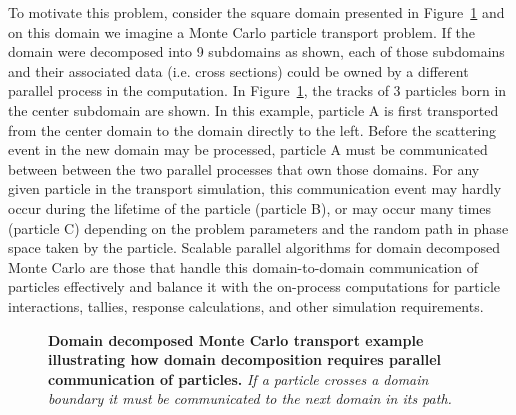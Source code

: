 To motivate this problem, consider the square domain presented in
Figure~\ref{fig:ddmc_example} and on this domain we imagine a Monte
Carlo particle transport problem. If the domain were decomposed into 9
subdomains as shown, each of those subdomains and their associated
data (i.e. cross sections) could be owned by a different parallel
process in the computation. In Figure~\ref{fig:ddmc_example}, the
tracks of 3 particles born in the center subdomain are shown. In this
example, particle A is first transported from the center domain to the
domain directly to the left. Before the scattering event in the new
domain may be processed, particle A must be communicated between
between the two parallel processes that own those domains. For any
given particle in the transport simulation, this communication event
may hardly occur during the lifetime of the particle (particle B), or
may occur many times (particle C) depending on the problem parameters
and the random path in phase space taken by the particle. Scalable
parallel algorithms for domain decomposed Monte Carlo are those that
handle this domain-to-domain communication of particles effectively
and balance it with the on-process computations for particle
interactions, tallies, response calculations, and other simulation
requirements.
\begin{figure}[t!]
  \begin{center}
    \scalebox{1.5}{
       }
  \end{center}
  \caption{\textbf{Domain decomposed Monte Carlo transport example
      illustrating how domain decomposition requires parallel
      communication of particles.} \textit{If a particle crosses a
      domain boundary it must be communicated to the next domain in
      its path.}}
  \label{fig:ddmc_example}
\end{figure}

